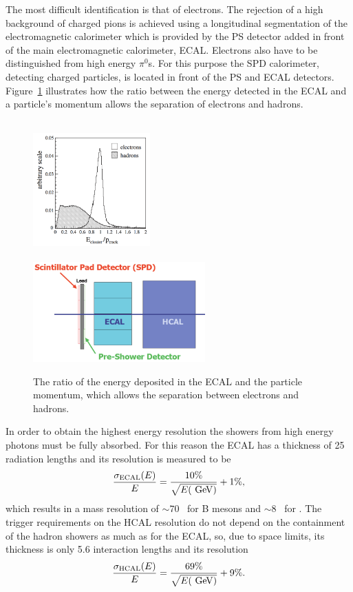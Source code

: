 The most difficult identification is that of electrons. The rejection of a high background of charged pions
is achieved using a longitudinal segmentation of the electromagnetic calorimeter which is provided by
the PS detector added in front of the main electromagnetic calorimeter, ECAL. Electrons also have to be 
distinguished from high energy $\pi^0$s. For this purpose the SPD calorimeter, detecting charged particles,
is located in front of the PS and ECAL detectors. Figure~\ref{fig:pi0_e_pid_perf} illustrates how the ratio between the
energy detected in the ECAL and a particle's momentum allows the separation of electrons and hadrons.

\begin{figure}[t!]
\centering
\includegraphics[width=0.4\textwidth,height=5.3cm]{Detector/figs/pi0_e_pid_perf.png}
\includegraphics[width=0.59\textwidth]{Detector/figs/calo_layout.png}
\caption{The ratio of the energy deposited in the ECAL and the particle momentum, which allows
the separation between electrons and hadrons. }
\label{fig:pi0_e_pid_perf}
\end{figure}

In order to obtain the highest energy resolution the showers from high energy photons 
must be fully absorbed. For this reason the ECAL has a thickness of 25 radiation lengths and its resolution is 
measured to be~\cite{Alves:2008zz}
 \begin{equation}
 \frac{\sigma_{\rm ECAL}(E)}{E} = \frac{10\%}{\sqrt{E(\gev )}} + 1\%,
 \end{equation}
%
which results in a mass resolution of $\sim 70$ \mevcc~for B mesons and $\sim 8$ \mevcc~for \piz.
The trigger requirements on the HCAL resolution do not depend on the containment of the hadron showers as much 
as for the ECAL, so, due to space limits, its thickness is only 5.6 interaction lengths and its resolution
%
 \begin{equation}
 \frac{\sigma_{\rm HCAL}(E)}{E} = \frac{69\%}{\sqrt{E(\gev )}} + 9\%.
 \end{equation}


